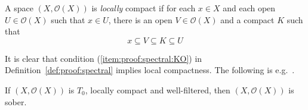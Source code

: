 \documentclass[%
  a4paper,
  UKenglish,
  cleveref,
  autoref,
  thm-restate,
  numberwithinsect,
]{lipics-v2021}
\newcommand\sle\subseteq
\newcommand\Open{\mathcal{O}}		%
\begin{document}
A space $(X,\Open(X))$ is \emph{locally} compact
if for each $x \in X$ and each open $U \in \Open(X)$
such that $x \in U$,
there is an open $V \in \Open(X)$ and a compact $K$
such that
\[
  x \sle V \sle K \sle U
\]

It is clear that condition (\ref{item:proof:spectral:KO})
in Definition~\ref{def:proof:spectral}
implies local compactness.
The following is e.g.~\cite[Proposition~8.3.8]{goubault13book}.

\begin{proposition}
\label{prop:proof:spectral:wf-sober}
If $(X, \Open(X))$ is $T_0$, locally compact and well-filtered,
then $(X, \Open(X))$ is sober.
\end{proposition}
\end{document}
